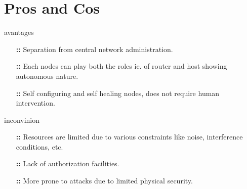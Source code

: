 \documentclass[11pt]{beamer}
\begin{document}
\section{Pros and Cos }
\begin{frame}{avantages}
\begin{itemize}
\item[\textbf{::}]Separation from central network administration.
\item[\textbf{::}]Each nodes can play both the roles ie. of router and host showing autonomous nature.
\item[\textbf{::}]Self configuring and self healing nodes, does not require human intervention.
\end{itemize}
\end{frame}
\begin{frame}{inconvinion}
\begin{itemize}
\item[\textbf{::}]Resources are limited due to various constraints like noise, interference conditions, etc.
\item[\textbf{::}]Lack of authorization facilities.
\item[\textbf{::}]More prone to attacks due to limited physical security.
\end{itemize}
\end{frame}
\end{document}
